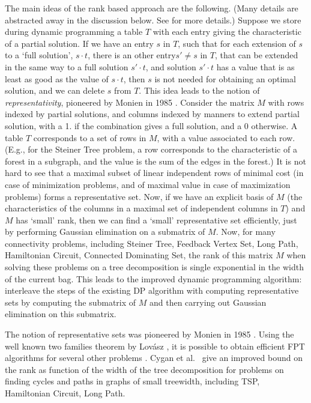 \documentclass{llncs}
\begin{document}
The main ideas of the rank based approach are the following. (Many
details are abstracted away in the discussion below. See \cite{BodlaenderCKN12}
for more details.)
Suppose
we store during dynamic programming a table $T$ with each entry giving
the characteristic of a partial solution. If we have an entry $s$ in $T$,
such that for each extension of $s$ to a `full solution', $s\cdot t$, there
is an other entry$s'\neq s$ in $T$, that can be extended in the same way to a full solution
$s' \cdot t$, and solution $s'\cdot t$ has a value that is as least as good as the
value of $s\cdot t$, then $s$ is not needed for obtaining an optimal solution,
and we can delete $s$ from $T$. This idea leads to the notion of
{\em representativity}, pioneered by Monien in 1985 \cite{Monien85}.
Consider the matrix $M$ with rows indexed by partial solutions, and
columns indexed by manners to extend partial solution, with a 1.
if the combination gives a full solution, and a 0 otherwise.
A table $T$ corresponds to a set of rows in $M$, with a value
associated to each row. (E.g., for the {\sc Steiner Tree} problem,
a row corresponds to the characteristic of a forest in a subgraph,
and the value is the sum of the edges in the forest.)
It is not hard to see that a maximal subset of linear independent rows of minimal cost
(in case of minimization problems, and of maximal value in case of
maximization problems) forms a representative set. 
Now, if we have an explicit basis of $M$ (the characteristics of the
columns in a maximal set of independent columns in $T$)
and $M$ has `small' rank, then we can find a `small' representative
set efficiently, just by performing Gaussian elimination on a submatrix of $M$.
Now, for many connectivity problems, including {\sc Steiner Tree},
{\sc Feedback Vertex Set}, {\sc Long Path}, {\sc Hamiltonian Circuit},
{\sc Connected Dominating Set}, the rank of this matrix $M$ when
solving these problems on a tree decomposition is single exponential
in the width of the current bag. This leads to the improved dynamic
programming algorithm: interleave the steps of the existing DP algorithm
with computing representative sets by computing the submatrix of $M$
and then carrying out Gaussian elimination on this submatrix.

The notion of representative sets was pioneered by Monien in 1985
\cite{Monien85}. Using the well known two families theorem by Lov\'{a}sz \cite{Lovasz77},
it is possible to obtain efficient FPT algorithms for several other
problems \cite{Marx09,FominLS13}. Cygan et al.~\cite{CyganKN12}
give an improved bound on the rank as function of the width of
the tree decomposition for problems on finding cycles and paths
in graphs of small treewidth, including {\sc TSP}, {\sc Hamiltonian Circuit},
{\sc Long Path}.
\end{document}
